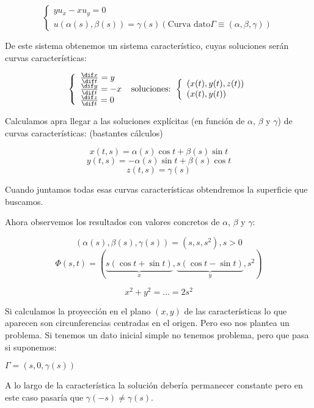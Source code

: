 	\begin{example}{2}

		\begin{equation*}
			\left\{
			\begin{array}{l}
				yu_x - x u_y = 0 \\
				u(\alpha(s),\beta(s)) = \gamma(s)
				(\text{Curva dato} \Gamma \equiv (\alpha, \beta, \gamma))
			\end{array}
			\right.
		\end{equation*}

		De este sistema obtenemos un sistema característico, cuyas soluciones serán curvas características:

		\begin{equation*}
			\left\{
			\begin{array}{l}
				\frac{\dif x}{\dif t} = y \\
				\frac{\dif y}{\dif t} = -x \\
				\frac{\dif z}{\dif t} = 0 \\
			\end{array}
			\right. \text{ soluciones: }
			\left\{
			\begin{array}{l}
				(x(t),y(t),z(t)) \\
				(x(t),y(t))
			\end{array}
			\right.
		\end{equation*}


		Calculamos apra llegar a las soluciones explícitas (en función de $\alpha$, $\beta$ y $\gamma$) de curvas características:
		(bastantes cálculos)

		$$x(t,s) = \alpha(s) \cos t + \beta (s) \sin t$$
		$$y(t,s) = -\alpha(s) \sin t + \beta (s) \cos t$$
		$$z(t,s) = \gamma(s)$$

		Cuando juntamos todas esas curvas características obtendremos la superficie que buscamos.

		Ahora observemos los resultados con valores concretos de $\alpha$, $\beta$ y $\gamma$:

		$$(\alpha(s), \beta(s), \gamma(s)) = (s,s,s^2), s>0$$
		$$\Phi(s,t) = (\underbrace{s(\cos t + \sin t)}_{x}, \underbrace{s(\cos t - \sin t)}_{y},s^2)$$

		$$x^2 + y^2 = … = 2s^2$$


		Si calculamos la proyección en el plano $(x,y)$ de las características lo que aparecen son circunferencias centradas en el origen. Pero eso nos plantea un problema. Si tenemos un dato inicial simple no tenemos problema, pero que pasa si suponemos:

		$\Gamma = (s,0,\gamma(s))$

		A lo largo de la característica la solución debería permanecer constante pero en este caso pasaría que $\gamma(-s) \neq \gamma(s)$.


	\end{example}

